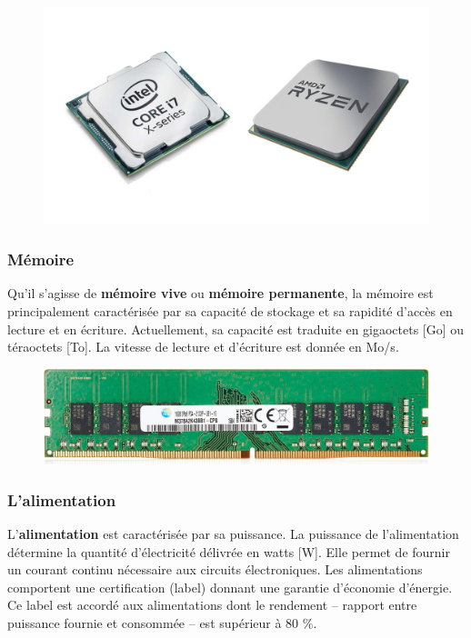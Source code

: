 \documentclass[11pt, a4paper]{book}
\begin{document}
\begin{figure}[h]
	\centering
	\includegraphics[scale=.15]{images/processeur}

\end{figure}


\subsubsection{Mémoire}

Qu'il s'agisse de {\bf mémoire vive} ou {\bf mémoire permanente}, la mémoire est principalement caractérisée par sa capacité de stockage et sa rapidité d'accès en lecture et en écriture. Actuellement, sa capacité est traduite en gigaoctets [Go] ou téraoctets [To]. La vitesse de lecture et d'écriture est donnée en Mo/s.

\begin{figure}[h]
	\centering
	\includegraphics[scale=.3]{images/sdram}

\end{figure}





\subsubsection{L'alimentation}

L’{\bf alimentation } est caractérisée par sa puissance. La puissance de l'alimentation détermine la quantité d'électricité délivrée en watts [W]. Elle permet de fournir un courant continu nécessaire aux circuits électroniques. Les alimentations comportent une certification (label) donnant une garantie d'économie d'énergie. Ce label est accordé aux alimentations dont le rendement – rapport entre puissance fournie et consommée – est supérieur à 80 \%.
\end{document}
